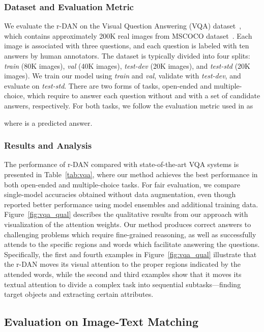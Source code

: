 \documentclass[10pt,twocolumn,letterpaper]{article}
\begin{document}
\subsubsection{Dataset and Evaluation Metric}
We evaluate the r-DAN on the Visual Question Answering (VQA) dataset~\cite{antol2015vqa}, which contains approximately 200K real images from MSCOCO dataset~\cite{lin2014microsoft}.
Each image is associated with three questions, and each question is labeled with ten answers by human annotators.
The dataset is typically divided into four splits: \emph{train} (80K images), \emph{val} (40K images), \emph{test-dev} (20K images), and \emph{test-std} (20K images).
We train our model using \emph{train} and \emph{val}, validate with \emph{test-dev}, and evaluate on \emph{test-std}.
There are two forms of tasks, open-ended and multiple-choice, which require to answer each question without and with a set of candidate answers, respectively.
For both tasks, we follow the evaluation metric used in \cite{antol2015vqa} as

where  is a predicted answer.

\subsubsection{Results and Analysis}
The performance of r-DAN compared with state-of-the-art VQA systems is presented in Table~\ref{tab:vqa}, where our method achieves the best performance in both open-ended and multiple-choice tasks.
For fair evaluation, we compare single-model accuracies obtained without data augmentation, even though \cite{fukui2016multimodal} reported better performance using model ensembles and additional training data.
Figure~\ref{fig:vqa_qual} describes the qualitative results from our approach with visualization of the attention weights.
Our method produces correct answers to challenging problems which require fine-grained reasoning, as well as successfully attends to the specific regions and words which facilitate answering the questions.
Specifically, the first and fourth examples in Figure~\ref{fig:vqa_qual} illustrate that the r-DAN moves its visual attention to the proper regions indicated by the attended words, while the second and third examples show that it moves its textual attention to divide a complex task into sequential subtasks---finding target objects and extracting certain attributes.



\subsection{Evaluation on Image-Text Matching}
\end{document}
